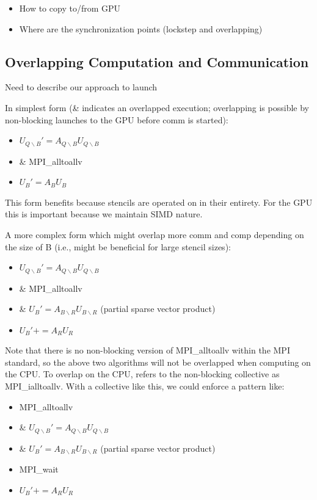 \begin{itemize} 
\item How to copy to/from GPU
\item Where are the synchronization points (lockstep and overlapping)
\end{itemize}



\subsection{Overlapping Computation and Communication} 
Need to describe our approach to launch 

In simplest form (\& indicates an overlapped execution; overlapping is possible by non-blocking launches to the GPU before comm is started): 
\begin{itemize} 
\item $ U_{Q \backslash B}' = A_{Q \backslash B} U_{Q \backslash B}$ 
\item \& MPI\_alltoallv
\item $ U_{B}' = A_{B} U_{B}$ 
\end{itemize} 
This form benefits because stencils are operated on in their entirety. For the GPU this is important because we maintain SIMD nature. 

A more complex form which might overlap more comm and comp depending on the size of B (i.e., might be beneficial for large stencil sizes): 
\begin{itemize} 
\item $ U_{Q \backslash B}' = A_{Q \backslash B} U_{Q \backslash B}$ 
\item \& MPI\_alltoallv
\item \& $ U_{B}' = A_{B \backslash R} U_{B \backslash R}$  (partial sparse vector product)
\item $ U_{B}' += A_{R} U_{R}$ 
\end{itemize} 

Note that there is no non-blocking version of MPI\_alltoallv within the MPI standard, so the above two algorithms will not be overlapped when computing on the CPU. To overlap on the CPU, \cite{Kandalla2011} refers to the non-blocking collective as MPI\_ialltoallv. With a collective like this, we could enforce a pattern like: 
\begin{itemize} 
\item MPI\_alltoallv
\item \& $ U_{Q \backslash B}' = A_{Q \backslash B} U_{Q \backslash B}$ 
\item \& $ U_{B}' = A_{B \backslash R} U_{B \backslash R}$  (partial sparse vector product)
\item MPI\_wait
\item $ U_{B}' += A_{R} U_{R}$ 
\end{itemize} 

